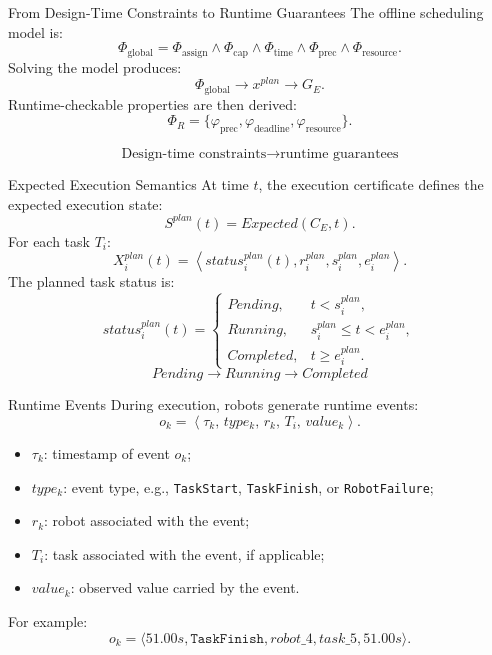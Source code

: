 \documentclass[aspectratio=169]{beamer}
\begin{document}
\begin{frame}{From Design-Time Constraints to Runtime Guarantees}
The offline scheduling model is:
\[
\Phi_{\mathrm{global}}
=
\Phi_{\mathrm{assign}}
\land
\Phi_{\mathrm{cap}}
\land
\Phi_{\mathrm{time}}
\land
\Phi_{\mathrm{prec}}
\land
\Phi_{\mathrm{resource}}.
\]
Solving the model produces:
\[
\Phi_{\mathrm{global}}\rightarrow x^{plan}\rightarrow G_E.
\]
Runtime-checkable properties are then derived:
\[
\Phi_R=
\{
\varphi_{\mathrm{prec}},
\varphi_{\mathrm{deadline}},
\varphi_{\mathrm{resource}}
\}.
\]

\[
\boxed{\text{Design-time constraints}\rightarrow\text{runtime guarantees}}
\]
\end{frame}

\begin{frame}{Expected Execution Semantics}
At time $t$, the execution certificate defines the expected execution state:
\[
\boxed{S^{plan}(t)=Expected(C_E,t)}.
\]
For each task $T_i$:
\[
X_i^{plan}(t)
=
\left\langle
status_i^{plan}(t),
r_i^{plan},
s_i^{plan},
e_i^{plan}
\right\rangle.
\]
The planned task status is:
\[
status_i^{plan}(t)=
\begin{cases}
Pending, & t < s_i^{plan},\\
Running, & s_i^{plan}\leq t < e_i^{plan},\\
Completed, & t\geq e_i^{plan}.
\end{cases}
\]
\[
\boxed{Pending\rightarrow Running\rightarrow Completed}
\]
\end{frame}

\begin{frame}{Runtime Events}
During execution, robots generate runtime events:
\[
o_k=
\left\langle
\tau_k,\,
type_k,\,
r_k,\,
T_i,\,
value_k
\right\rangle.
\]
\begin{itemize}
    \item $\tau_k$: timestamp of event $o_k$;
    \item $type_k$: event type, e.g., \texttt{TaskStart}, \texttt{TaskFinish}, or \texttt{RobotFailure};
    \item $r_k$: robot associated with the event;
    \item $T_i$: task associated with the event, if applicable;
    \item $value_k$: observed value carried by the event.
\end{itemize}

For example:
\[
o_k=\langle 51.00s,\texttt{TaskFinish},robot\_4,task\_5,51.00s\rangle.
\]
\end{frame}
\end{document}
